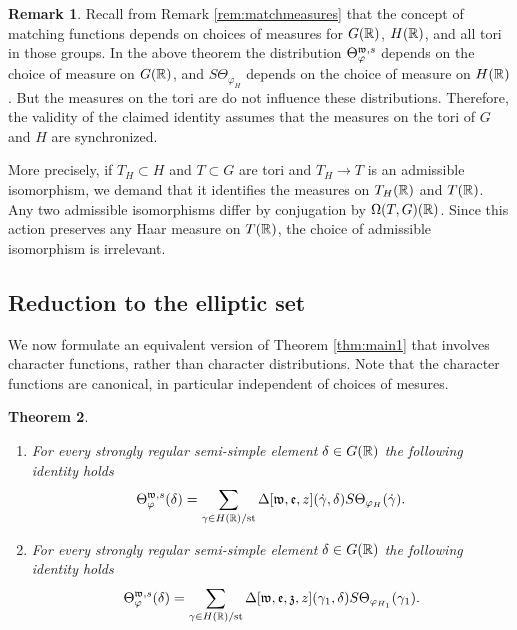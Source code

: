 \documentclass{article}
\newtheorem{thm}{Theorem}[subsection]
\theoremstyle{definition}
\newtheorem{rem}[thm]{Remark}
\numberwithin{equation}{section}
\renewcommand{\-}{\hyp{}}
\begin{document}
\begin{rem} \label{rem:measures}
	Recall from Remark \ref{rem:matchmeasures} that the concept of matching functions depends on choices of measures for $G(\mathbb{R})$, $H(\mathbb{R})$, and all tori in those groups. In the above theorem the distribution $\Theta^{\mathfrak{w},s}_\varphi$ depends on the choice of measure on $G(\mathbb{R})$, and $S\Theta_{\varphi_H}$ depends on the choice of measure on $H(\mathbb{R})$. But the measures on the tori are do not influence these distributions. Therefore, the validity of the claimed identity assumes that the measures on the tori of $G$ and $H$ are synchronized.

	More precisely, if $T_H \subset H$ and $T \subset G$ are tori and $T_H \to T$ is an admissible isomorphism, we demand that it identifies the measures  on $T_H(\mathbb{R})$ and $T(\mathbb{R})$. Any two admissible isomorphisms differ by conjugation by $\Omega(T,G)(\mathbb{R})$. Since this action preserves any Haar measure on $T(\mathbb{R})$, the choice of admissible isomorphism is irrelevant.
\end{rem}

\subsection{Reduction to the elliptic set}

We now formulate an equivalent version of Theorem \ref{thm:main1} that involves character functions, rather than character distributions. Note that the character functions are canonical, in particular independent of choices of mesures.

\begin{thm} \label{thm:main2}
\begin{enumerate}
	\item For every strongly regular semi-simple element $\delta \in G(\mathbb{R})$ the following identity holds
	\[ \Theta_\varphi^{\mathfrak{w},s}(\delta) = \sum_{\gamma \in H(\mathbb{R})/\textrm{st}} \Delta[\mathfrak{w},\mathfrak{e},z](\dot\gamma,\delta)S\Theta_{\varphi_H}(\dot\gamma). \]
	\item For every strongly regular semi-simple element $\delta \in G(\mathbb{R})$ the following identity holds
	\[ \Theta_\varphi^{\mathfrak{w},s}(\delta) = \sum_{\gamma \in H(\mathbb{R})/\textrm{st}} \Delta[\mathfrak{w},\mathfrak{e},\mathfrak{z},z](\gamma_1,\delta)S\Theta_{\varphi_{H_1}}(\gamma_1). \]
\end{enumerate}
\end{thm}
\end{document}
